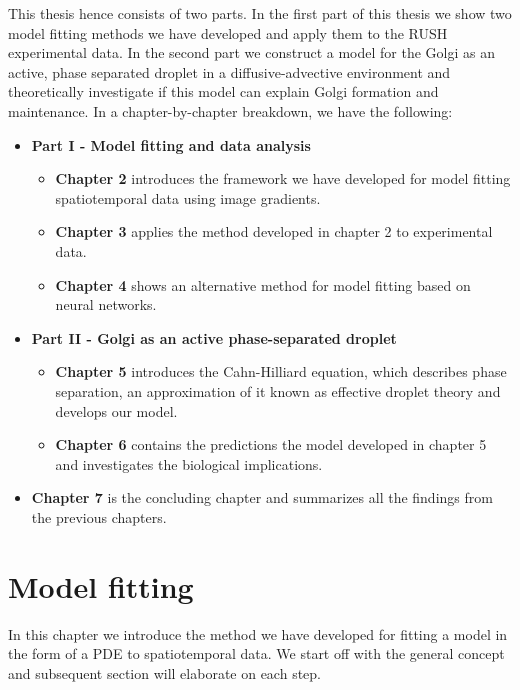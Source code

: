 \documentclass{Dissertate}
\providecommand{\tightlist}{%
  \setlength{\itemsep}{0pt}\setlength{\parskip}{0pt}}
\begin{document}
This thesis hence consists of two parts. In the first part of this thesis we show two model fitting methods we have developed and apply them to the RUSH experimental data. In the second part we construct a model for the Golgi as an active, phase separated droplet in a diffusive-advective environment and theoretically investigate if this model can explain Golgi formation and maintenance. In a chapter-by-chapter breakdown, we have the
following:

\begin{itemize}
\tightlist
\item
  \textbf{Part I - Model fitting and data analysis}

  \begin{itemize}
  \tightlist
  \item
    \textbf{Chapter 2} introduces the framework we have developed for
    model fitting spatiotemporal data using image gradients.
  \item
    \textbf{Chapter 3} applies the method developed in chapter 2 to
    experimental data.
  \item
    \textbf{Chapter 4} shows an alternative method for model fitting
    based on neural networks.
  \end{itemize}
\item
  \textbf{Part II - Golgi as an active phase-separated droplet }

  \begin{itemize}
  \tightlist
  \item
    \textbf{Chapter 5} introduces the Cahn-Hilliard equation, which
    describes phase separation, an approximation of it known as
    effective droplet theory and develops our model.
  \item
    \textbf{Chapter 6} contains the predictions the model developed in
    chapter 5 and investigates the biological implications.
  \end{itemize}
\item
  \textbf{Chapter 7} is the concluding chapter and summarizes all the
  findings from the previous chapters.
\end{itemize}

\hypertarget{model-fitting}{%
\chapter{Model fitting}\label{model-fitting}}

In this chapter we introduce the method we have developed for fitting a
model in the form of a PDE to spatiotemporal data. We start off with the general concept and subsequent section will elaborate on each step.
\end{document}
